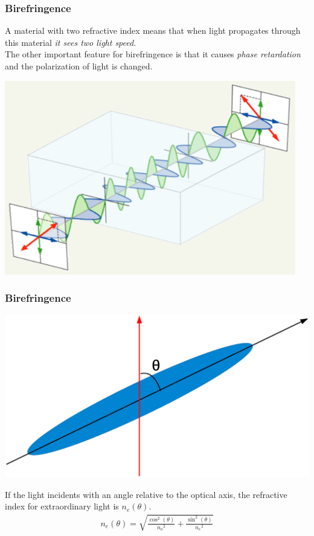 \documentclass{beamer}
\begin{document}
\begin{frame}
\frametitle{Birefringence}
A material with two refractive index means that when light propagates through this material \emph{it sees two light speed}. \\
The other important feature for birefringence is that it causes \emph{phase retardation} and the polarization of light is changed.
\begin{center}
\includegraphics[scale=0.4]{phase_retardation.jpg}
\end{center}
\end{frame}
\begin{frame}
\frametitle{Birefringence}
\begin{center}
\includegraphics[scale=0.3]{n_eff.eps}
\end{center}
If the light incidents with an angle relative to the optical axis, the refractive index for extraordinary light is $n_e(\theta)$.
\begin{eqnarray}
n_e(\theta) = \sqrt{\frac{\cos^2(\theta)}{{n_o}^2}+\frac{\sin^2(\theta)}{{n_e}^2}}
\end{eqnarray}
\end{frame}
\end{document}
